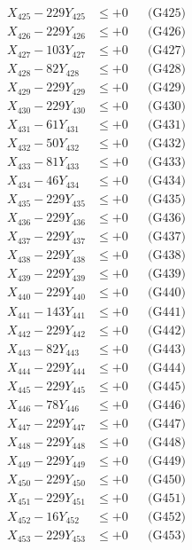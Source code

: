 \documentclass[a4paper,10pt]{article}
\begin{document}
{\begin{align}
X_{425} - 229Y_{425} &\leq +0 && \text{(G425)} \\
X_{426} - 229Y_{426} &\leq +0 && \text{(G426)} \\
X_{427} - 103Y_{427} &\leq +0 && \text{(G427)} \\
X_{428} - 82Y_{428} &\leq +0 && \text{(G428)} \\
X_{429} - 229Y_{429} &\leq +0 && \text{(G429)} \\
X_{430} - 229Y_{430} &\leq +0 && \text{(G430)} \\
\allowbreak
X_{431} - 61Y_{431} &\leq +0 && \text{(G431)} \\
X_{432} - 50Y_{432} &\leq +0 && \text{(G432)} \\
X_{433} - 81Y_{433} &\leq +0 && \text{(G433)} \\
X_{434} - 46Y_{434} &\leq +0 && \text{(G434)} \\
X_{435} - 229Y_{435} &\leq +0 && \text{(G435)} \\
X_{436} - 229Y_{436} &\leq +0 && \text{(G436)} \\
X_{437} - 229Y_{437} &\leq +0 && \text{(G437)} \\
X_{438} - 229Y_{438} &\leq +0 && \text{(G438)} \\
X_{439} - 229Y_{439} &\leq +0 && \text{(G439)} \\
X_{440} - 229Y_{440} &\leq +0 && \text{(G440)} \\
\allowbreak
X_{441} - 143Y_{441} &\leq +0 && \text{(G441)} \\
X_{442} - 229Y_{442} &\leq +0 && \text{(G442)} \\
X_{443} - 82Y_{443} &\leq +0 && \text{(G443)} \\
X_{444} - 229Y_{444} &\leq +0 && \text{(G444)} \\
X_{445} - 229Y_{445} &\leq +0 && \text{(G445)} \\
X_{446} - 78Y_{446} &\leq +0 && \text{(G446)} \\
X_{447} - 229Y_{447} &\leq +0 && \text{(G447)} \\
X_{448} - 229Y_{448} &\leq +0 && \text{(G448)} \\
X_{449} - 229Y_{449} &\leq +0 && \text{(G449)} \\
X_{450} - 229Y_{450} &\leq +0 && \text{(G450)} \\
\allowbreak
X_{451} - 229Y_{451} &\leq +0 && \text{(G451)} \\
X_{452} - 16Y_{452} &\leq +0 && \text{(G452)} \\
X_{453} - 229Y_{453} &\leq +0 && \text{(G453)} \\

\end{align}}
\end{document}
